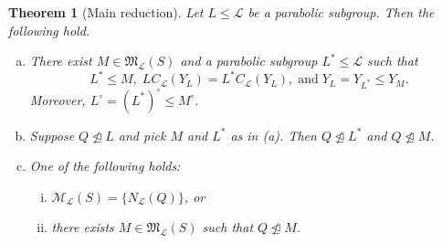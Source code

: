\documentclass{amsart}
\numberwithin{equation}{section}
\newtheorem{theorem}[equation]{Theorem}
\theoremstyle{definition}
\theoremstyle{subresult}
\theoremstyle{caseresult}
\newcommand{\M}{\mathcal{M}}
\newcommand{\gM}{\mathfrak{M}}
\renewcommand{\L}{\mathcal{L}}
\newcommand{\norm}{\trianglelefteq}
\newcommand{\<}{\langle}
\renewcommand{\>}{\rangle}
\begin{document}
\begin{theorem}[Main reduction]\label{theorem: main reduction}
	Let $L \le \L$ be a parabolic subgroup. Then the following hold.
	\begin{enumerate}[(a)]
		\item There exist $M \in \gM_\L(S)$ and a parabolic subgroup $L^* \le \L$ such that
		\[
		L^* \le M, \; LC_\L(Y_L) = L^*C_\L(Y_L), \; \text{and} \; Y_L=Y_{L^*} \le Y_M.
		\]
		Moreover, $L^\circ = (L^*)^\circ \le M^\circ$.
		\item Suppose $Q \not \norm L$ and pick $M$ and $L^*$ as in (a). Then $Q \not \norm L^*$ and $Q \not \norm M$.
		\item One of the following holds:
		\begin{enumerate}[(i)]
			\item $\M_\L(S) = \{N_\L(Q) \}$, or
			\item there exists $M \in \gM_\L(S)$ such that $Q \not \norm M$.
		\end{enumerate}
	\end{enumerate}
\end{theorem}
\end{document}
